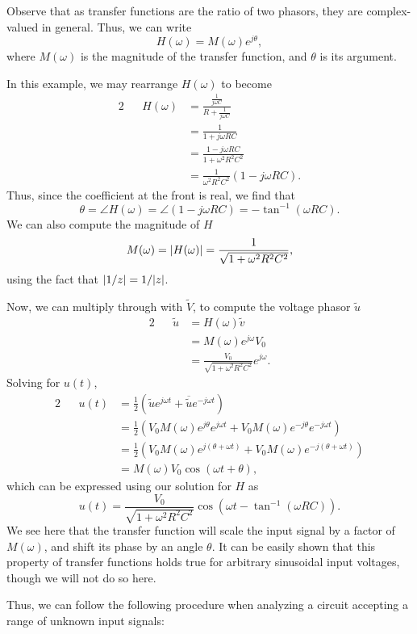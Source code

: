 \documentclass[letterpaper]{article}
\theoremstyle{remark}
\renewcommand{\tilde}[1]{\widetilde{#1}}
\DeclarePairedDelimiter\abs{\lvert}{\rvert}%
\newcommand{\eqn}[1]{\begin{alignat*}{2}#1\end{alignat*}}
\begin{document}
Observe that as transfer functions are the ratio of two phasors, they are complex-valued in general. Thus, we can write
\[
    H(\omega) = M(\omega) e^{j \theta},
\]
where $M(\omega)$ is the magnitude of the transfer function, and $\theta$ is its argument.

In this example, we may rearrange $H(\omega)$ to become
\eqn{
    && H(\omega) &= \frac{\frac{1}{j\omega C}}{R + \frac{1}{j\omega C}} \\
    &&&= \frac{1}{1 + j\omega RC} \\
    &&&= \frac{1 - j\omega RC}{1 + \omega^2R^2C^2} \\
    &&&= \frac{1}{\omega^2R^2C^2} (1 - j\omega RC).
}
Thus, since the coefficient at the front is real, we find that
\[
    \theta = \angle H(\omega) = \angle(1 - j\omega RC) = -\tan^{-1}(\omega RC).
\]
We can also compute the magnitude of $H$
\[
    M(\omega) = \abs{H(\omega)} = \frac{1}{\sqrt{1 + \omega^2 R^2C^2}},
\]
using the fact that $\abs{1/z} = 1 / \abs{z}$.

Now, we can multiply through with $\tilde{V}$, to compute the voltage phasor $\tilde{u}$
\eqn{
    && \tilde{u} &= H(\omega) \tilde{v} \\
    &&&= M(\omega) e^{j\omega} V_0 \\
    &&&= \frac{V_0}{\sqrt{1 + \omega^2R^2C^2}} e^{j\omega}.
}
Solving for $u(t)$,
\eqn{
    && u(t) &= \frac{1}{2} \left( \tilde{u}e^{j\omega t} + \overline{\tilde{u}}e^{-j\omega t} \right) \\
    &&&= \frac{1}{2} \left(V_0M(\omega) e^{j\theta} e^{j\omega t} + V_0M(\omega) e^{-j\theta} e^{-j\omega t} \right) \\
    &&&= \frac{1}{2} \left(V_0M(\omega) e^{j(\theta + \omega t)} + V_0M(\omega) e^{-j(\theta + \omega t)} \right) \\
    &&&= M(\omega) V_0 \cos{(\omega t + \theta)},
}
which can be expressed using our solution for $H$ as
\[
    u(t) = \frac{V_0}{\sqrt{1 + \omega^2 R^2C^2}} \cos{(\omega t -\tan^{-1}(\omega RC))}.
\]
We see here that the transfer function will scale the input signal by a factor of $M(\omega)$, and shift its phase by an angle $\theta$. It can be easily shown that this property of transfer functions holds true for arbitrary sinusoidal input voltages, though we will not do so here.

Thus, we can follow the following procedure when analyzing a circuit accepting a range of unknown input signals:
\end{document}
